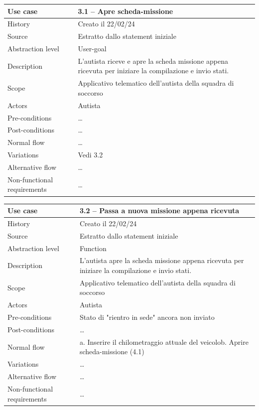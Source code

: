 \documentclass{article}
\begin{document}
    \begin{table}
        \begin{tabularx}{\textwidth}{l|X}
            Use case & \textbf{3.1 – Apre scheda-missione}\\
            \hline
            History & Creato il 22/02/24\\
            Source & Estratto dallo statement iniziale\\
            Abstraction level & User-goal\\
            Description & L'autista riceve e apre la scheda missione appena ricevuta per iniziare la compilazione e invio stati.\\
            Scope & Applicativo telematico dell'autista della squadra di soccorso\\
            Actors & Autista\\
            Pre-conditions & \dots \\
            Post-conditions & \dots \\
            Normal flow & \dots\\
            Variations & Vedi 3.2 \\
            Alternative flow & \dots \\
            Non-functional requirements & \dots
        \end{tabularx}
        \label{tab:usecase3.1}
    \end{table}

    \begin{table}
        \begin{tabularx}{\textwidth}{l|X}
            Use case & \textbf{3.2 – Passa a nuova missione appena ricevuta}\\
            \hline
            History & Creato il 22/02/24\\
            Source & Estratto dallo statement iniziale\\
            Abstraction level & Function\\
            Description & L'autista apre la scheda missione appena ricevuta per iniziare la compilazione e invio stati.\\
            Scope & Applicativo telematico dell'autista della squadra di soccorso\\
            Actors & Autista\\
            Pre-conditions & Stato di "rientro in sede" ancora non inviato \\
            Post-conditions & \dots \\
            Normal flow & a. Inserire il chilometraggio attuale del veicolo\newline b. Aprire scheda-missione (4.1)\\
            Variations & \dots \\
            Alternative flow & \dots \\
            Non-functional requirements & \dots
        \end{tabularx}
        \label{tab:usecase3.2}
    \end{table}
\end{document}

